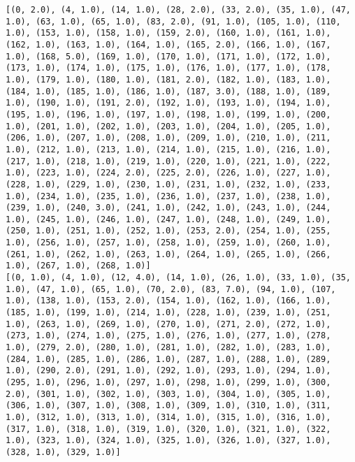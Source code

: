 \documentclass[11pt]{article}
\begin{document}
\begin{Verbatim}[commandchars=\\\{\}]
[(0, 2.0), (4, 1.0), (14, 1.0), (28, 2.0), (33, 2.0), (35, 1.0), (47, 1.0), (63, 1.0), (65, 1.0), (83, 2.0), (91, 1.0), (105, 1.0), (110, 1.0), (153, 1.0), (158, 1.0), (159, 2.0), (160, 1.0), (161, 1.0), (162, 1.0), (163, 1.0), (164, 1.0), (165, 2.0), (166, 1.0), (167, 1.0), (168, 5.0), (169, 1.0), (170, 1.0), (171, 1.0), (172, 1.0), (173, 1.0), (174, 1.0), (175, 1.0), (176, 1.0), (177, 1.0), (178, 1.0), (179, 1.0), (180, 1.0), (181, 2.0), (182, 1.0), (183, 1.0), (184, 1.0), (185, 1.0), (186, 1.0), (187, 3.0), (188, 1.0), (189, 1.0), (190, 1.0), (191, 2.0), (192, 1.0), (193, 1.0), (194, 1.0), (195, 1.0), (196, 1.0), (197, 1.0), (198, 1.0), (199, 1.0), (200, 1.0), (201, 1.0), (202, 1.0), (203, 1.0), (204, 1.0), (205, 1.0), (206, 1.0), (207, 1.0), (208, 1.0), (209, 1.0), (210, 1.0), (211, 1.0), (212, 1.0), (213, 1.0), (214, 1.0), (215, 1.0), (216, 1.0), (217, 1.0), (218, 1.0), (219, 1.0), (220, 1.0), (221, 1.0), (222, 1.0), (223, 1.0), (224, 2.0), (225, 2.0), (226, 1.0), (227, 1.0), (228, 1.0), (229, 1.0), (230, 1.0), (231, 1.0), (232, 1.0), (233, 1.0), (234, 1.0), (235, 1.0), (236, 1.0), (237, 1.0), (238, 1.0), (239, 1.0), (240, 3.0), (241, 1.0), (242, 1.0), (243, 1.0), (244, 1.0), (245, 1.0), (246, 1.0), (247, 1.0), (248, 1.0), (249, 1.0), (250, 1.0), (251, 1.0), (252, 1.0), (253, 2.0), (254, 1.0), (255, 1.0), (256, 1.0), (257, 1.0), (258, 1.0), (259, 1.0), (260, 1.0), (261, 1.0), (262, 1.0), (263, 1.0), (264, 1.0), (265, 1.0), (266, 1.0), (267, 1.0), (268, 1.0)]
[(0, 1.0), (4, 1.0), (12, 4.0), (14, 1.0), (26, 1.0), (33, 1.0), (35, 1.0), (47, 1.0), (65, 1.0), (70, 2.0), (83, 7.0), (94, 1.0), (107, 1.0), (138, 1.0), (153, 2.0), (154, 1.0), (162, 1.0), (166, 1.0), (185, 1.0), (199, 1.0), (214, 1.0), (228, 1.0), (239, 1.0), (251, 1.0), (263, 1.0), (269, 1.0), (270, 1.0), (271, 2.0), (272, 1.0), (273, 1.0), (274, 1.0), (275, 1.0), (276, 1.0), (277, 1.0), (278, 1.0), (279, 2.0), (280, 1.0), (281, 1.0), (282, 1.0), (283, 1.0), (284, 1.0), (285, 1.0), (286, 1.0), (287, 1.0), (288, 1.0), (289, 1.0), (290, 2.0), (291, 1.0), (292, 1.0), (293, 1.0), (294, 1.0), (295, 1.0), (296, 1.0), (297, 1.0), (298, 1.0), (299, 1.0), (300, 2.0), (301, 1.0), (302, 1.0), (303, 1.0), (304, 1.0), (305, 1.0), (306, 1.0), (307, 1.0), (308, 1.0), (309, 1.0), (310, 1.0), (311, 1.0), (312, 1.0), (313, 1.0), (314, 1.0), (315, 1.0), (316, 1.0), (317, 1.0), (318, 1.0), (319, 1.0), (320, 1.0), (321, 1.0), (322, 1.0), (323, 1.0), (324, 1.0), (325, 1.0), (326, 1.0), (327, 1.0), (328, 1.0), (329, 1.0)]

    \end{Verbatim}
\end{document}
